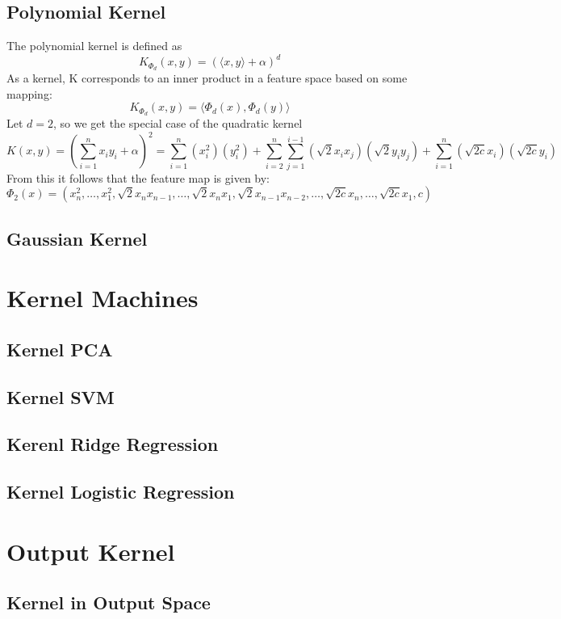 \documentclass[12pt]{article}
\theoremstyle{definition}
\theoremstyle{remark}
\begin{document}
\subsection{Polynomial Kernel}
The polynomial kernel is defined as
\[
  K_{\Phi_{d}}(x, y) = {(\langle x,y \rangle + \alpha)}^{d}
\]
As a kernel, K corresponds to an inner product in a feature space based on some mapping:
\[
  K_{\Phi_{d}}(x, y) = \langle \Phi_{d}(x), \Phi_{d}(y) \rangle
\]
Let \( d=2 \), so we get the special case of the quadratic kernel
\[
  K(x, y) = (\sum_{i=1}^{n} x_{i}y_{i} + \alpha)^{2} = \sum_{i=1}^{n}(x_{i}^{2})(y_{i}^{2}) + \sum_{i=2}^{n}\sum_{j=1}^{i-1}(\sqrt{2}x_{i}x_{j})(\sqrt{2}y_{i}y_{j}) + \sum_{i=1}^{n}(\sqrt{2c}x_{i})(\sqrt{2c}y_{i})
\]
From this it follows that the feature map is given by:
\[
  \Phi_{2}(x) = (x_{n}^{2},\dots,x_{1}^{2},\sqrt{2}x_{n}x_{n-1},\dots,\sqrt{2}x_{n}x_{1},\sqrt{2}x_{n-1}x_{n-2},\dots,\sqrt{2c}x_{n},\dots,\sqrt{2c}x_{1},c)
\]


\subsection{Gaussian Kernel}

\section{Kernel Machines}
\subsection{Kernel PCA}
\subsection{Kernel SVM}
\subsection{Kerenl Ridge Regression}
\subsection{Kernel Logistic Regression}

\section{Output Kernel}
\subsection{Kernel in Output Space}
\end{document}
